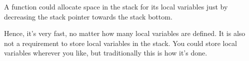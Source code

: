 
A function could allocate space in the stack for its local variables just by decreasing 
the \gls{stack pointer} towards the stack bottom.


Hence, it's very fast, no matter how many local variables are defined.
It is also not a requirement to store local variables in the stack.
You could store local variables wherever you like, 
but traditionally this is how it's done.

